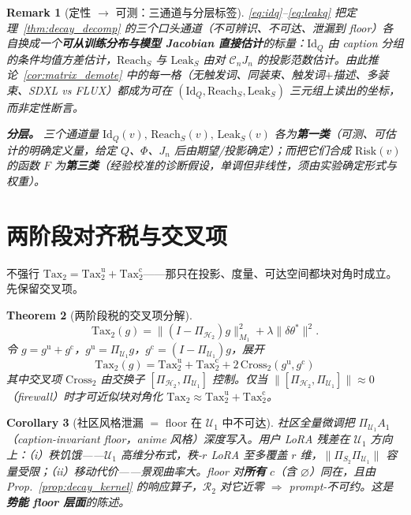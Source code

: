 \documentclass[11pt,a4paper]{article}
\newtheorem{theorem}{Theorem}[section]
\newtheorem{corollary}[theorem]{Corollary}
\newtheorem{remark}[theorem]{Remark}
\newcommand{\cH}{\mathcal{H}}
\newcommand{\cR}{\mathcal{R}}
\newcommand{\cU}{\mathcal{U}}
\newcommand{\ProjectOp}{\Pi}
\newcommand{\uu}{\mathrm{u}}
\newcommand{\cc}{\mathrm{c}}
\newcommand{\nul}{\varnothing}
\newcommand{\Center}{\mathcal{C}}
\begin{document}
\begin{remark}[定性 $\to$ 可测：三通道与分层标签]
\eqref{eq:idq}--\eqref{eq:leakq} 把定理~\ref{thm:decay_decomp} 的三个口头通道（不可辨识、不可达、泄漏到 floor）各自换成一个\textbf{可从训练分布与模型 Jacobian 直接估计}的标量：$\mathrm{Id}_Q$ 由 caption 分组的条件均值方差估计，$\mathrm{Reach}_S$ 与 $\mathrm{Leak}_S$ 由对 $\Center_n J_n$ 的投影范数估计。由此推论~\ref{cor:matrix_demote} 中的每一格（无触发词、同装束、触发词$+$描述、多装束、SDXL vs FLUX）都成为可在 $(\mathrm{Id}_Q,\mathrm{Reach}_S,\mathrm{Leak}_S)$ 三元组上读出的坐标，而非定性断言。

\smallskip
\noindent\textbf{分层。} 三个通道量 $\mathrm{Id}_Q(v),\,\mathrm{Reach}_S(v),\,\mathrm{Leak}_S(v)$ 各为\textbf{第一类}（可测、可估计的明确定义量，给定 $Q$、$\Phi$、$J_n$ 后由期望/投影确定）；而把它们合成 $\mathrm{Risk}(v)$ 的函数 $F$ 为\textbf{第三类}（经验校准的诊断假设，单调但非线性，须由实验确定形式与权重）。
\end{remark}

\section{两阶段对齐税与交叉项}
\label{sec:two_stage_cross}

不强行 $\text{Tax}_2=\text{Tax}_2^{\uu}+\text{Tax}_2^{\cc}$——那只在投影、度量、可达空间都块对角时成立。先保留交叉项。

\begin{theorem}[两阶段税的交叉项分解]\label{thm:tax_cross}
\begin{equation}\label{eq:tax_full}
\text{Tax}_2(g) = \|(I-\ProjectOp_{\cH_2})g\|_{M_1}^2 + \lambda\|\delta\theta^*\|^2.
\end{equation}
令 $g=g^{\uu}+g^{\cc}$，$g^{\uu}=\ProjectOp_{\cU_1}g$，$g^{\cc}=(I-\ProjectOp_{\cU_1})g$，展开
\begin{equation}\label{eq:tax_expand}
\boxed{
\text{Tax}_2(g) = \text{Tax}_2^{\uu} + \text{Tax}_2^{\cc} + 2\,\mathrm{Cross}_2(g^{\uu},g^{\cc})
}
\end{equation}
其中交叉项 $\mathrm{Cross}_2$ 由交换子 $[\ProjectOp_{\cH_2},\ProjectOp_{\cU_1}]$ 控制。仅当 $\|[\ProjectOp_{\cH_2},\ProjectOp_{\cU_1}]\|\approx 0$（firewall）时才可近似块对角化 $\text{Tax}_2\approx\text{Tax}_2^{\uu}+\text{Tax}_2^{\cc}$。
\end{theorem}

\begin{corollary}[社区风格泄漏 $=$ floor 在 $\cU_1$ 中不可达]\label{cor:style_floor}
社区全量微调把 $\ProjectOp_{\cU_1}A_1$（caption-invariant floor，anime 风格）深度写入。用户 LoRA 残差在 $\cU_1$ 方向上：（i）秩饥饿——$\cU_1$ 高维分布式，秩-$r$ LoRA 至多覆盖 $r$ 维，$\|\ProjectOp_{S_2}\ProjectOp_{\cU_1}\|$ 容量受限；（ii）移动代价——景观曲率大。floor 对\textbf{所有} $c$（含 $\nul$）同在，且由 Prop.~\ref{prop:decay_kernel} 的响应算子，$\cR_2$ 对它近零 $\Rightarrow$ prompt-不可约。这是\textbf{势能 floor 层面}的陈述。
\end{corollary}
\end{document}
